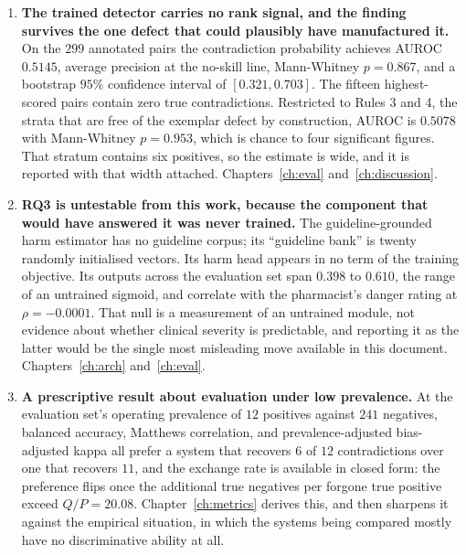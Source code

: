 \begin{enumerate}
\item \textbf{The trained detector carries no rank signal, and the finding
      survives the one defect that could plausibly have manufactured it.} On the
      $299$ annotated pairs the contradiction probability achieves AUROC
      $0.5145$, average precision at the no-skill line, Mann-Whitney $p = 0.867$,
      and a bootstrap $95\%$ confidence interval of $[0.321, 0.703]$. The
      fifteen highest-scored pairs contain zero true contradictions. Restricted
      to Rules 3 and 4, the strata that are free of the exemplar defect by
      construction, AUROC is $0.5078$ with Mann-Whitney $p = 0.953$, which is
      chance to four significant figures. That stratum contains six positives,
      so the estimate is wide, and it is reported with that width attached.
      Chapters~\ref{ch:eval} and~\ref{ch:discussion}.

\item \textbf{RQ3 is untestable from this work, because the component that would
      have answered it was never trained.} The guideline-grounded harm estimator
      has no guideline corpus; its ``guideline bank'' is twenty randomly
      initialised vectors. Its harm head appears in no term of the training
      objective. Its outputs across the evaluation set span $0.398$ to $0.610$,
      the range of an untrained sigmoid, and correlate with the pharmacist's
      danger rating at $\rho = -0.0001$. That null is a measurement of an
      untrained module, not evidence about whether clinical severity is
      predictable, and reporting it as the latter would be the single most
      misleading move available in this document. Chapters~\ref{ch:arch}
      and~\ref{ch:eval}.

\item \textbf{A prescriptive result about evaluation under low prevalence.} At
      the evaluation set's operating prevalence of $12$ positives against $241$
      negatives, balanced accuracy, Matthews correlation, and
      prevalence-adjusted bias-adjusted kappa all prefer a system that recovers
      $6$ of $12$ contradictions over one that recovers $11$, and the exchange
      rate is available in closed form: the preference flips once the additional
      true negatives per forgone true positive exceed $Q/P = 20.08$.
      Chapter~\ref{ch:metrics} derives this, and then sharpens it against the
      empirical situation, in which the systems being compared mostly have no
      discriminative ability at all.
\end{enumerate}

